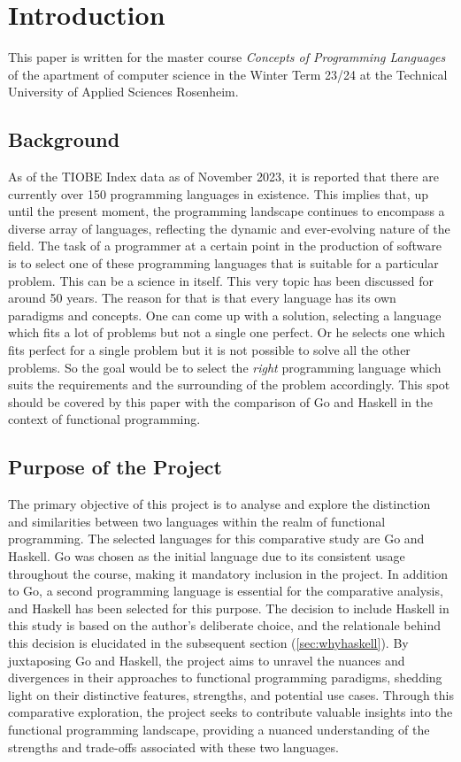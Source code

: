 \chapter{Introduction}\label{chap:introduction}
This paper is written for the master course \textit{Concepts of Programming Languages} of the apartment of computer science in the Winter Term 23/24 at the Technical University of Applied Sciences Rosenheim.
    \section{Background}\label{sec:background}
As of the TIOBE Index data as of November 2023, it is reported that there are currently over 150 programming languages in existence. This implies that, up until the present moment, the programming landscape continues to encompass a diverse array of languages, reflecting the dynamic and ever-evolving nature of the field.\cite{tiobeindex} The task of a programmer at a certain point in the production of software is to select one of these programming languages that is suitable for a particular problem. This can be a science in itself. This very topic has been discussed for around 50 years.\cite{Tharp1982}
The reason for that is that every language has its own paradigms and concepts. One can come up with a solution, selecting a language which fits a lot of problems but not a single one perfect. Or he selects one which fits perfect for a single problem but it is not possible to solve all the other problems.
So the goal would be to select the \textit{right} programming language which suits the requirements and the surrounding of the problem accordingly.
This spot should be covered by this paper with the comparison of Go and Haskell in the context of functional programming.

    \section{Purpose of the Project}\label{sec:purpose}
The primary objective of this project is to analyse and explore the distinction and similarities between two languages within the realm of functional programming. The selected languages for this comparative study are Go and Haskell. Go was chosen as the initial language due to its consistent usage throughout the course, making it mandatory inclusion in the project. 
In addition to Go, a second programming language is essential for the comparative analysis, and Haskell has been selected for this purpose. The decision to include Haskell in this study is based on the author's deliberate choice, and the relationale behind this decision is elucidated in the subsequent section (\ref{sec:whyhaskell}). By juxtaposing Go and Haskell, the project aims to unravel the nuances and divergences in their approaches to functional programming paradigms, shedding light on their distinctive features, strengths, and potential use cases. Through this comparative exploration, the project seeks to contribute valuable insights into the functional programming landscape, providing a nuanced understanding of the strengths and trade-offs associated with these two languages.

